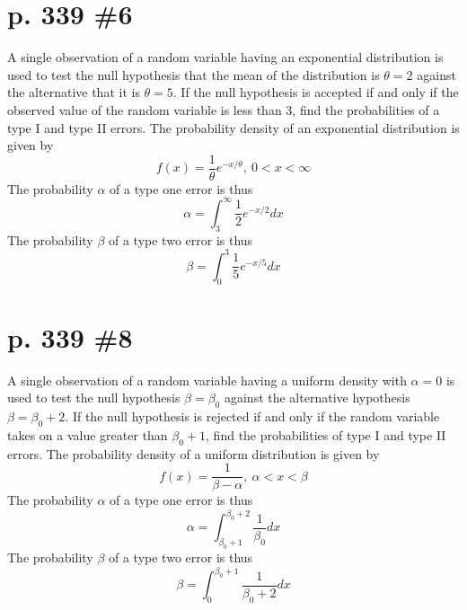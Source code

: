 \documentclass[12pt]{article}
\begin{document}
	\section[20pt]{p. 339 \#6}
	A single observation of a random variable having an exponential distribution is used to test the null hypothesis that the mean of the distribution is \(\theta = 2\) against the alternative that it is \(\theta = 5\). If the null hypothesis is accepted if and only if the observed value of the random variable is less than 3, find the probabilities of a type I and type II errors.
	\newline \newline
	The probability density of an exponential distribution is given by
	\[f(x) = \frac{1}{\theta}e^{-x/\theta},\ 0 < x < \infty\]
	The probability \(\alpha\) of a type one error is thus
	\[\alpha = \int_{3}^{\infty}\frac{1}{2}e^{-x/2}dx\]
	\newline
	The probability \(\beta\) of a type two error is thus
	\[\beta = \int_{0}^3\frac{1}{5}e^{-x/5}dx\]
	\newpage
	\section[20pt]{p. 339 \#8}
	A single observation of a random variable having a uniform density with \(\alpha = 0\) is used to test the null hypothesis \(\beta = \beta_0\) against the alternative hypothesis \(\beta = \beta_0 + 2\). If the null hypothesis is rejected if and only if the random variable takes on a value greater than \(\beta_0 + 1\), find the probabilities of type I and type II errors.
	\newline \newline
	The probability density of a uniform distribution is given by
	\[f(x) = \frac{1}{\beta - \alpha},\ \alpha < x < \beta\]
	The probability \(\alpha\) of a type one error is thus
	\[\alpha = \int_{\beta_0 + 1}^{\beta_0 + 2}\frac{1}{\beta_0}dx\]
	\newline
	The probability \(\beta\) of a type two error is thus
	\[\beta = \int_{0}^{\beta_0 + 1}\frac{1}{\beta_0 + 2}dx\]
\end{document}

